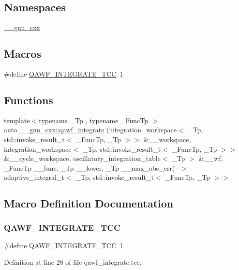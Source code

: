 \subsection*{Namespaces}
\begin{DoxyCompactItemize}
\item 
 \hyperlink{namespace____gnu__cxx}{\+\_\+\+\_\+gnu\+\_\+cxx}
\end{DoxyCompactItemize}
\subsection*{Macros}
\begin{DoxyCompactItemize}
\item 
\#define \hyperlink{qawf__integrate_8tcc_acf0125f351d8836cfaac72248cfb453a}{Q\+A\+W\+F\+\_\+\+I\+N\+T\+E\+G\+R\+A\+T\+E\+\_\+\+T\+CC}~1
\end{DoxyCompactItemize}
\subsection*{Functions}
\begin{DoxyCompactItemize}
\item 
{\footnotesize template$<$typename \+\_\+\+Tp , typename \+\_\+\+Func\+Tp $>$ }\\auto \hyperlink{namespace____gnu__cxx_a2657d7a52bfc5f277572557f86e1c1e0}{\+\_\+\+\_\+gnu\+\_\+cxx\+::qawf\+\_\+integrate} (integration\+\_\+workspace$<$ \+\_\+\+Tp, std\+::invoke\+\_\+result\+\_\+t$<$ \+\_\+\+Func\+Tp, \+\_\+\+Tp $>$$>$ \&\+\_\+\+\_\+workspace, integration\+\_\+workspace$<$ \+\_\+\+Tp, std\+::invoke\+\_\+result\+\_\+t$<$ \+\_\+\+Func\+Tp, \+\_\+\+Tp $>$$>$ \&\+\_\+\+\_\+cycle\+\_\+workspace, oscillatory\+\_\+integration\+\_\+table$<$ \+\_\+\+Tp $>$ \&\+\_\+\+\_\+wf, \+\_\+\+Func\+Tp \+\_\+\+\_\+func, \+\_\+\+Tp \+\_\+\+\_\+lower, \+\_\+\+Tp \+\_\+\+\_\+max\+\_\+abs\+\_\+err) -\/$>$ adaptive\+\_\+integral\+\_\+t$<$ \+\_\+\+Tp, std\+::invoke\+\_\+result\+\_\+t$<$ \+\_\+\+Func\+Tp, \+\_\+\+Tp $>$$>$
\end{DoxyCompactItemize}


\subsection{Macro Definition Documentation}
\mbox{\label{qawf__integrate_8tcc_acf0125f351d8836cfaac72248cfb453a}} 
\subsubsection{\texorpdfstring{Q\+A\+W\+F\+\_\+\+I\+N\+T\+E\+G\+R\+A\+T\+E\+\_\+\+T\+CC}{QAWF\_INTEGRATE\_TCC}}
{\footnotesize\ttfamily \#define Q\+A\+W\+F\+\_\+\+I\+N\+T\+E\+G\+R\+A\+T\+E\+\_\+\+T\+CC~1}



Definition at line 28 of file qawf\+\_\+integrate.\+tcc.

